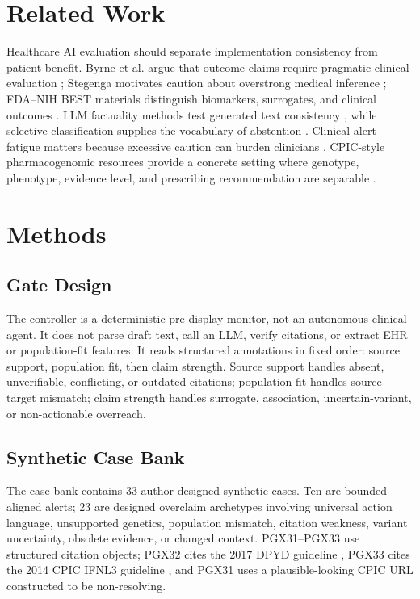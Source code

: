 \documentclass[pmlr,twocolumn,10pt]{jmlr}
\begin{document}
\section{Related Work}
Healthcare AI evaluation should separate implementation consistency from patient benefit.
Byrne et al. argue that outcome claims require pragmatic clinical evaluation \citep{byrne2024ai}; Stegenga motivates caution about overstrong medical inference \citep{stegenga2018medical}; FDA--NIH BEST materials distinguish biomarkers, surrogates, and clinical outcomes \citep{bestresource}.
LLM factuality methods test generated text consistency \citep{manakul2023selfcheckgpt}, while selective classification supplies the vocabulary of abstention \citep{geifman2017selective}.
Clinical alert fatigue matters because excessive caution can burden clinicians \citep{ancker2017alertfatigue}.
CPIC-style pharmacogenomic resources provide a concrete setting where genotype, phenotype, evidence level, and prescribing recommendation are separable \citep{cpicguidelines,lee2022cyp2c19,amstutz2018dpyd}.

\section{Methods}
\subsection{Gate Design}
The controller is a deterministic pre-display monitor, not an autonomous clinical agent.
It does not parse draft text, call an LLM, verify citations, or extract EHR or population-fit features.
It reads structured annotations in fixed order: source support, population fit, then claim strength.
Source support handles absent, unverifiable, conflicting, or outdated citations; population fit handles source-target mismatch; claim strength handles surrogate, association, uncertain-variant, or non-actionable overreach.

\subsection{Synthetic Case Bank}
The case bank contains 33 author-designed synthetic cases.
Ten are bounded aligned alerts; 23 are designed overclaim archetypes involving universal action language, unsupported genetics, population mismatch, citation weakness, variant uncertainty, obsolete evidence, or changed context.
PGX31--PGX33 use structured citation objects; PGX32 cites the 2017 DPYD guideline \citep{amstutz2018dpyd}, PGX33 cites the 2014 CPIC IFNL3 guideline \citep{muir2014ifnl3}, and PGX31 uses a plausible-looking CPIC URL constructed to be non-resolving.
\end{document}

